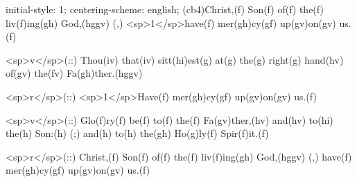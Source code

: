 initial-style: 1;
centering-scheme: english;
(cb4)Christ,(f) Son(f) of(f) the(f) liv(f)ing(gh) God,(hggv) (,) <sp>1</sp>have(f) mer(gh)cy(gf) up(gv)on(gv) us.(f) 

<sp>v</sp>(::) Thou(iv) that(iv) sitt(hi)est(g) at(g) the(g) right(g) hand(hv) of(gv) the(fv) Fa(gh)ther.(hggv) 

<sp>r</sp>(::) <sp>1</sp>Have(f) mer(gh)cy(gf) up(gv)on(gv) us.(f) 

<sp>v</sp>(::) Glo(f)ry(f) be(f) to(f) the(f) Fa(gv)ther,(hv) and(hv) to(hi) the(h) Son:(h) (;) and(h) to(h) the(gh) Ho(g)ly(f) Spir(f)it.(f)

<sp>r</sp>(::) Christ,(f) Son(f) of(f) the(f) liv(f)ing(gh) God,(hggv) (,) have(f) mer(gh)cy(gf) up(gv)on(gv) us.(f) 